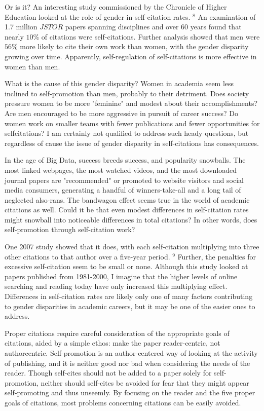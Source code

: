 Or is it? An interesting study commissioned by the Chronicle of Higher Education looked at the role of gender in self-citation rates. ${ }^{8}$ An examination of 1.7 million $J S T O R$ papers spanning disciplines and over 60 years found that nearly $10 \%$ of citations were self-citations. Further analysis showed that men were $56 \%$ more likely to cite their own work than women, with the gender disparity growing over time. Apparently, self-regulation of self-citations is more effective in women than men.

What is the cause of this gender disparity? Women in academia seem less inclined to self-promotion than men, probably to their detriment. Does society pressure women to be more "feminine" and modest about their accomplishments? Are men encouraged to be more aggressive in pursuit of career success? Do women work on smaller teams with fewer publications and fewer opportunities for selfcitations? I am certainly not qualified to address such heady questions, but regardless of cause the issue of gender disparity in self-citations has consequences.

In the age of Big Data, success breeds success, and popularity snowballs. The most linked webpages, the most watched videos, and the most downloaded journal papers are "recommended" or promoted to website visitors and social media consumers, generating a handful of winners-take-all and a long tail of neglected also-rans. The bandwagon effect seems true in the world of academic citations as well. Could it be that even modest differences in self-citation rates might snowball into noticeable differences in total citations? In other words, does self-promotion through self-citation work?

One 2007 study showed that it does, with each self-citation multiplying into three other citations to that author over a five-year period. ${ }^{9}$ Further, the penalties for excessive self-citation seem to be small or none. Although this study looked at papers published from 1981-2000, I imagine that the higher levels of online searching and reading today have only increased this multiplying effect. Differences in self-citation rates are likely only one of many factors contributing to gender disparities in academic careers, but it may be one of the easier ones to address.

Proper citations require careful consideration of the appropriate goals of citations, aided by a simple ethos: make the paper reader-centric, not authorcentric. Self-promotion is an author-centered way of looking at the activity of publishing, and it is neither good nor bad when considering the needs of the reader. Though self-cites should not be added to a paper solely for self-promotion, neither should self-cites be avoided for fear that they might appear self-promoting and thus unseemly. By focusing on the reader and the five proper goals of citations, most problems concerning citations can be easily avoided.

